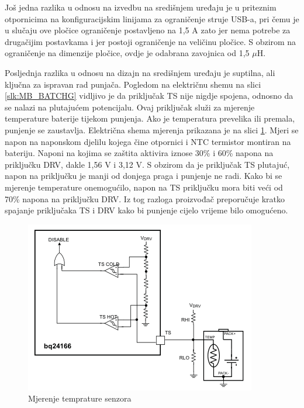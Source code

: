 Još jedna razlika u odnosu na izvedbu na središnjem uređaju je u priteznim otpornicima na konfiguracijskim linijama za ograničenje struje USB-a, pri čemu je u slučaju ove pločice ograničenje postavljeno na 1,5 A zato jer nema potrebe za drugačijim postavkama i jer postoji ograničenje na veličinu pločice. S obzirom na ograničenje na dimenzije pločice, ovdje je odabrana zavojnica od 1,5 $\mu \textrm{H}$.

Posljednja razlika u odnosu na dizajn na središnjem uređaju je suptilna, ali ključna za ispravan rad punjača. Pogledom na električnu shemu na slici \ref{slk:MB_BATCHG} vidljivo je da priključak TS nije nigdje spojena, odnosno da se nalazi na plutajućem potencijalu. Ovaj priključak služi za mjerenje temperature baterije tijekom punjenja. Ako je temperatura prevelika ili premala, punjenje se zaustavlja. Električna shema mjerenja prikazana je na slici \ref{slk:BATCHG_TS}. Mjeri se napon na naponskom djelilu kojega čine otpornici i NTC termistor montiran na bateriju. Naponi na kojima se zaštita aktivira iznose 30\% i 60\% napona na priključku DRV, dakle 1,56 V i 3,12 V. S obzirom da je priključak TS plutajuć, napon na priključku je manji od donjega praga i punjenje ne radi. Kako bi se mjerenje temperature onemogućilo, napon na TS priključku mora biti veći od 70\% napona na priključku DRV. Iz tog razloga proizvođač preporučuje kratko spajanje priključaka TS i DRV kako bi punjenje cijelo vrijeme bilo omogućeno.
\begin{figure}[htb]
    \centering
    \includegraphics[width=10 cm]{Figures/BATCHG_TS.png}
    \caption{Mjerenje temprature senzora \cite{ti:bq24166}}
    \label{slk:BATCHG_TS}
\end{figure}

